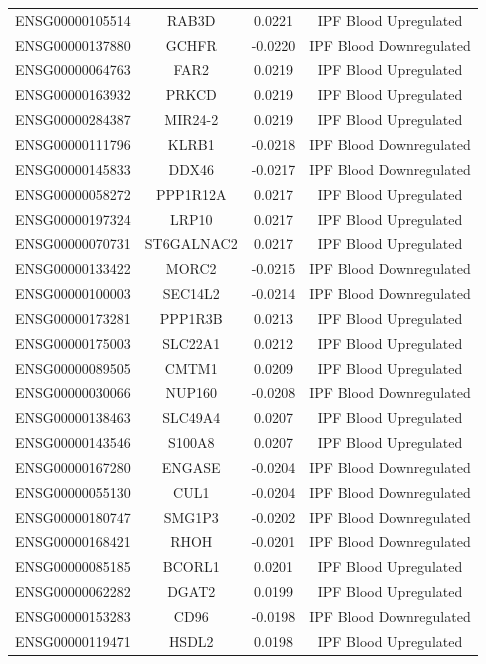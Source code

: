 \documentclass[
]{article}
\begin{document}
\begin{singlespace}
\begin{longtable}[t]{lccc}
ENSG00000105514 & RAB3D & 0.0221 & IPF Blood Upregulated\\
ENSG00000137880 & GCHFR & -0.0220 & IPF Blood Downregulated\\
ENSG00000064763 & FAR2 & 0.0219 & IPF Blood Upregulated\\
ENSG00000163932 & PRKCD & 0.0219 & IPF Blood Upregulated\\
\addlinespace
ENSG00000284387 & MIR24-2 & 0.0219 & IPF Blood Upregulated\\
ENSG00000111796 & KLRB1 & -0.0218 & IPF Blood Downregulated\\
ENSG00000145833 & DDX46 & -0.0217 & IPF Blood Downregulated\\
ENSG00000058272 & PPP1R12A & 0.0217 & IPF Blood Upregulated\\
ENSG00000197324 & LRP10 & 0.0217 & IPF Blood Upregulated\\
\addlinespace
ENSG00000070731 & ST6GALNAC2 & 0.0217 & IPF Blood Upregulated\\
ENSG00000133422 & MORC2 & -0.0215 & IPF Blood Downregulated\\
ENSG00000100003 & SEC14L2 & -0.0214 & IPF Blood Downregulated\\
ENSG00000173281 & PPP1R3B & 0.0213 & IPF Blood Upregulated\\
ENSG00000175003 & SLC22A1 & 0.0212 & IPF Blood Upregulated\\
\addlinespace
ENSG00000089505 & CMTM1 & 0.0209 & IPF Blood Upregulated\\
ENSG00000030066 & NUP160 & -0.0208 & IPF Blood Downregulated\\
ENSG00000138463 & SLC49A4 & 0.0207 & IPF Blood Upregulated\\
ENSG00000143546 & S100A8 & 0.0207 & IPF Blood Upregulated\\
ENSG00000167280 & ENGASE & -0.0204 & IPF Blood Downregulated\\
\addlinespace
ENSG00000055130 & CUL1 & -0.0204 & IPF Blood Downregulated\\
ENSG00000180747 & SMG1P3 & -0.0202 & IPF Blood Downregulated\\
ENSG00000168421 & RHOH & -0.0201 & IPF Blood Downregulated\\
ENSG00000085185 & BCORL1 & 0.0201 & IPF Blood Upregulated\\
ENSG00000062282 & DGAT2 & 0.0199 & IPF Blood Upregulated\\
\addlinespace
ENSG00000153283 & CD96 & -0.0198 & IPF Blood Downregulated\\
ENSG00000119471 & HSDL2 & 0.0198 & IPF Blood Upregulated\\

\end{longtable}
\end{singlespace}
\end{document}
